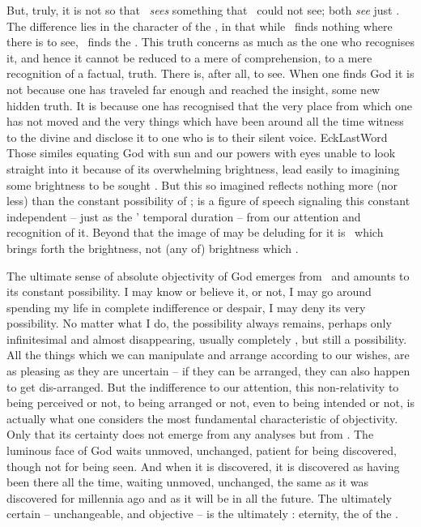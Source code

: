 \pa
But, truly, it is not so that \Yes\ {\em sees} something that \No\ could not see;
both {\em see} just . The difference lies in the character of the
, in that while \No\ finds nothing where there is 
to see, \Yes\ finds the . This truth concerns  as much
as the one who recognises it, and hence it cannot be reduced to a mere 
of comprehension, to a mere recognition of a factual,  truth.
There is, after all,  to see.  When one finds God it is not because
one has traveled far enough and reached the insight, some new hidden truth. It
is because one has recognised that the very place from which one has not moved
and the very things which have been around all the time witness to the divine
 and disclose it to one who is  to their silent voice.
%
\citet{Some people make believe to find God as a light or savour; they may find
  a light or a savour but that is not to find God. According to one scripture,
  God shines in the dark where every now and then we may catch a glimpse of him.
  Where to us God shows least he is often most.}{EckLastWord}{} Those similes
equating God with sun and our powers with eyes unable to look straight into it
because of its overwhelming brightness, lead easily to imagining some
 brightness to be sought .  But this so imagined
 reflects nothing more (nor less) than the constant
possibility of \Yes;  is a figure of speech signaling this
constant  independent -- just as the ' temporal
duration -- from our attention and recognition of it.  Beyond that the image of
 may be deluding for it is \Yes\ which brings forth the
brightness, not (any  of) brightness which  \Yes.

The ultimate sense of absolute {objectivity} of God emerges from \Yes\ and
amounts to its constant possibility. I may know or believe it, or not, I may go
around spending my life in complete indifference or despair, I may deny its very
possibility. No matter what I do, the possibility always remains, perhaps only
infinitesimal and almost disappearing, usually completely , but
still a possibility.  All the things which we can manipulate and arrange
according to our wishes, are as pleasing as they are uncertain -- if they can be
arranged, they can also happen to get dis-arranged.  But the indifference to our
attention, this non-relativity to being perceived or not, to being arranged or
not, even to being intended or not, is actually what one considers the most
fundamental characteristic of {objectivity}. Only that its certainty does not
emerge from any analyses but from . The luminous face of God waits
unmoved, unchanged, patient for being discovered, though not for being seen. And
when it is discovered, it is discovered as having been there all the time,
waiting unmoved, unchanged, the same as it was discovered for millennia ago and
as it will be in all the future. The ultimately certain -- unchangeable,
 and objective -- is the ultimately : eternity, the
 of the .
%

